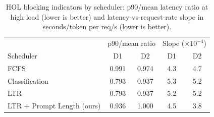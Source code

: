 \begin{table}[t]
    \centering 
    \caption{HOL blocking indicators by scheduler: p90/mean latency ratio at
    high load (lower is better) and latency-vs-request-rate slope in
    seconds/token per req/s (lower is better).}
    \label{tab:hol_blocking}
    \begin{tabular}{@{}lcccc@{}}
        \toprule
        & \multicolumn{2}{c}{p90/mean ratio} & \multicolumn{2}{c}{Slope ($\times 10^{-4}$)} \\
        Scheduler & D1 & D2 & D1 & D2 \\
        \midrule
        FCFS                        & 0.991 & 0.974 & 4.3 & 4.7 \\
        Classification              & 0.793 & 0.937 & 5.3 & 5.2 \\
        LTR                         & 0.793 & 0.937 & 5.2 & 5.2 \\
        LTR + Prompt Length (ours)  & 0.936 & 1.000 & 4.5 & 3.8 \\
        \bottomrule
    \end{tabular}
\end{table}
